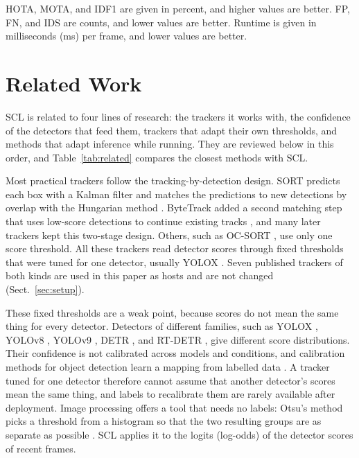 \documentclass[pdflatex,sn-mathphys-num,iicol]{sn-jnl}
\newcommand{\scl}{SCL}
\begin{document}
HOTA, MOTA, and IDF1 are given in percent, and higher values are better. FP,
FN, and IDS are counts, and lower values are better. Runtime is given in
milliseconds (ms) per frame, and lower values are better.
\section{Related Work}\label{sec:related}

\scl{} is related to four lines of research: the trackers it works with, the
confidence of the detectors that feed them, trackers that adapt their own
thresholds, and methods that adapt inference while running. They are
reviewed below in this order, and Table~\ref{tab:related} compares the
closest methods with \scl{}.

Most practical trackers follow the tracking-by-detection design. SORT
predicts each box with a Kalman filter and matches the predictions to new
detections by overlap with the Hungarian method \cite{bewley2016sort}.
ByteTrack added a second matching step that uses low-score detections to
continue existing tracks \cite{zhang2022bytetrack}, and many later trackers
kept this two-stage design. Others, such as OC-SORT \cite{cao2023ocsort}, use
only one score threshold. All these trackers read detector scores through
fixed thresholds that were tuned for one detector, usually YOLOX
\cite{ge2021yolox}. Seven published trackers of both kinds are used in this
paper as hosts and are not changed (Sect.~\ref{sec:setup}).

These fixed thresholds are a weak point, because scores do not mean the same
thing for every detector. Detectors of different families, such as YOLOX
\cite{ge2021yolox}, YOLOv8 \cite{jocher2023yolov8}, YOLOv9
\cite{wang2024yolov9}, DETR \cite{carion2020detr}, and RT-DETR
\cite{zhao2024rtdetr}, give different score distributions. Their confidence
is not calibrated across models and conditions, and calibration methods for
object detection learn a mapping from labelled data
\cite{kuppers2020detcalib}. A tracker tuned for one detector therefore cannot
assume that another detector's scores mean the same thing, and labels to
recalibrate them are rarely available after deployment. Image processing
offers a tool that needs no labels: Otsu's method picks a threshold from a
histogram so that the two resulting groups are as separate as possible
\cite{otsu1979}. \scl{} applies it to the logits (log-odds) of the detector
scores of recent frames.
\end{document}
